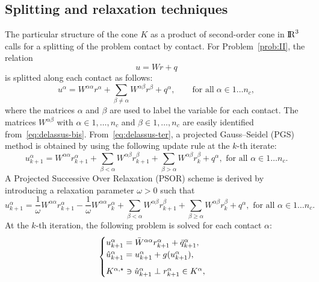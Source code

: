 \subsection{Splitting and relaxation techniques}
\label{Sec:SplittingTechniques}
 The particular structure of the cone $K$ as a product of second-order cone in $\mathrm{I\!R}^3$
 calls for a splitting of the problem contact by contact.
For Problem~\ref{prob:II}, the relation
\begin{equation}
  \label{eq:delassus-bis}
  u = W r+q
\end{equation}
is splitted along each contact as follows:
\begin{equation}
  \label{eq:delassus-ter}
  u^\alpha = W^{\alpha\alpha} r^\alpha + \sum_{\beta\neq \alpha}W^{\alpha\beta} r^\beta +  q^\alpha, \qquad\text{for all}\; \alpha \in 1\ldots n_c,
\end{equation}
where the matrices $\alpha$ and $\beta$ are used to label the variable for each contact.
 The matrices $W^{\alpha\beta}$ with $\alpha \in 1,\ldots, n_c$ and $\beta \in 1,\ldots, n_c $ are easily identified from~\eqref{eq:delassus-bis}.
 From~\eqref{eq:delassus-ter}, a projected Gauss--Seidel (PGS) method is obtained by using the following update rule at the $k$-th iterate:
\begin{equation}
  \label{eq:pgs-1}
  u^{\alpha}_{k+1} = W^{\alpha\alpha} r^{\alpha}_{k+1} + \sum_{\beta < \alpha}W^{\alpha\beta} r^{\beta}_{k+1} + \sum_{\beta > \alpha}W^{\alpha\beta} r^{\beta}_{k} +  q^\alpha, \text{ for all } \alpha \in 1\ldots n_c.
\end{equation}
A Projected Successive Over Relaxation (PSOR) scheme is derived by introducing a relaxation parameter $\omega>0$ such that
\begin{equation}
  \label{eq:psor-1}
  u^{\alpha}_{k+1} = \frac 1 \omega W^{\alpha\alpha} r^{\alpha}_{k+1} 
  - \frac 1 \omega W^{\alpha\alpha} r^{\alpha}_{k} +
  \sum_{\beta < \alpha}W^{\alpha\beta} r^{\beta}_{k+1} + \sum_{\beta \geq \alpha}W^{\alpha\beta} r^{\beta}_{k} +  q^\alpha, \text{ for all } \alpha \in 1\ldots n_c.
\end{equation}
At the $k$-th iteration, the following problem is solved for each contact $\alpha$:
\begin{equation}\label{eq:psor-3}
  \begin{cases}
    u^{\alpha}_{k+1} =  \Bar W^{\alpha\alpha}  r^{\alpha}_{k+1} + \bar q^{\alpha}_{k+1}, \\
    \hat u^{\alpha}_{k+1} =u^{\alpha}_{k+1} + g(u^{\alpha}_{k+1}), \\[2mm]
    K^{\alpha,\star} \ni {\hat u^{\alpha}_{k+1}} \perp r^{\alpha}_{k+1} \in K^\alpha,
  \end{cases}
\end{equation}
